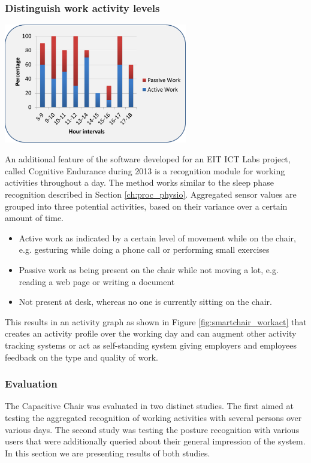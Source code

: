 \subsubsection*{Distinguish work activity levels}
\begin{minipage}{\linewidth}
\centering
\includegraphics[width=0.6\textwidth]{images/smartchair_workact}
\label{fig:smartchair_workact}
\end{minipage}
An additional feature of the software developed for an EIT ICT Labs project, called Cognitive Endurance during 2013 is a recognition module for working activities throughout a day. The method works similar to the sleep phase recognition described in Section \ref{ch:proc_physio}. Aggregated sensor values are grouped into three potential activities, based on their variance over a certain amount of time.
\begin{itemize}
\item Active work as indicated by a certain level of movement while on the chair, e.g. gesturing while doing a phone call or performing small exercises
\item Passive work as being present on the chair while not moving a lot, e.g. reading a web page or writing a document
\item Not present at desk, whereas no one is currently sitting on the chair.
\end{itemize}

This results in an activity graph as shown in Figure \ref{fig:smartchair_workact} that creates an activity profile over the working day and can augment other activity tracking systems or act as self-standing system giving employers and employees feedback on the type and quality of work.

\subsubsection{Evaluation}
The Capacitive Chair was evaluated in two distinct studies. The first aimed at testing the aggregated recognition of working activities with several persons over various days. The second study was testing the posture recognition with various users that were additionally queried about their general impression of the system. In this section we are presenting results of both studies.

